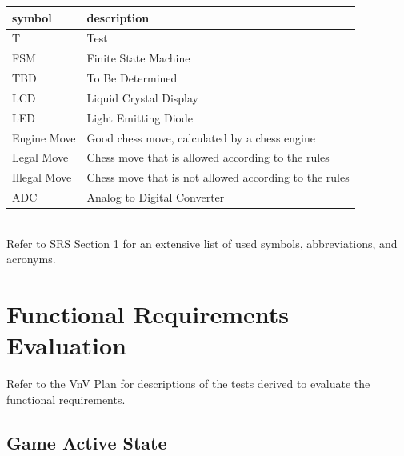\documentclass[12pt, titlepage]{article}
\begin{document}
\renewcommand{\arraystretch}{1.2}
\begin{tabular}{l l} 
    \toprule		
    \textbf{symbol} & \textbf{description}\\
    \midrule 
    T & Test\\
  FSM & Finite State Machine\\
    TBD & To Be Determined\\
    LCD & Liquid Crystal Display\\
    LED & Light Emitting Diode\\
    Engine Move & Good chess move, calculated by a chess engine\\
    Legal Move & Chess move that is allowed according to the rules\\
    Illegal Move & Chess move that is not allowed according to the rules\\
    ADC & Analog to Digital Converter\\
  \bottomrule
\end{tabular}\\

Refer to SRS Section 1 for an extensive list of used symbols, abbreviations, and acronyms.

\newpage

\tableofcontents

\listoftables %

\listoffigures %

\newpage


\section{Functional Requirements Evaluation}
Refer to the VnV Plan for descriptions of the tests derived to evaluate the functional requirements.
\subsection{Game Active State}
\end{document}
